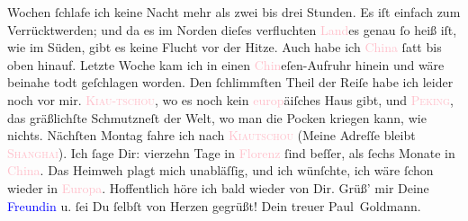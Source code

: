                Wochen ſchlafe {\pb}ich keine Nacht mehr als zwei bis
               drei Stunden. Es iſt einfach zum Verrücktwerden; und da es im Norden dieſes
               verfluchten \textcolor{pink}{Land}{}es genau ſo
               heiß iſt, wie im Süden, gibt es keine Flucht vor der Hitze. Auch habe ich \textcolor{pink}{China}{}\ledrightnote{\textcolor{pink}{China}} ſatt bis oben hinauf. Letzte Woche kam ich
               in einen \textcolor{pink}{Chin}{}eſen-Aufruhr
               hinein und wäre beinahe todt geſchlagen worden. Den ſchlimmſten Theil der Reiſe habe
               ich leider noch vor mir. \textsc{\textcolor{pink}{Kiau-tschou}{}\ledrightnote{\textcolor{pink}{Kiautschou}}}, wo es noch kein \textcolor{pink}{europ}{}äiſches Haus gibt, und \textsc{\textcolor{pink}{Peking}{}\ledrightnote{\textcolor{pink}{Peking}}}, das gräßlichſte Schmutzneſt der {\pb}Welt, wo man
               die Pocken kriegen kann, wie nichts. Nächſten Montag
               fahre ich nach \textsc{\textcolor{pink}{Kiautschou}{}\ledrightnote{\textcolor{pink}{Kiautschou}}} (Meine Adreſſe bleibt \textsc{\textcolor{pink}{Shanghai}{}\ledrightnote{\textcolor{pink}{Shanghai}}}). Ich ſage Dir: vierzehn Tage in \textcolor{pink}{Florenz}{}\ledrightnote{\textcolor{pink}{Florenz}}
               ſind beſſer, als ſechs Monate in \textcolor{pink}{China}{}\ledrightnote{\textcolor{pink}{China}}. Das
               Heimweh plagt mich unabläſſig, und ich wünſchte, ich wäre ſchon wieder in \textcolor{pink}{Europa}{}\ledrightnote{\textcolor{pink}{Europa}}.\pend
           \pstart
           Hoffentlich höre ich bald wieder von Dir. Grüß’ mir Deine \textcolor{blue}{Freundin}{} u. ſei Du ſelbſt von Herzen
               gegrüßt! Dein treuer \spacefill\mbox{Paul Goldmann.}\pend
           \endnumbering{}  
      